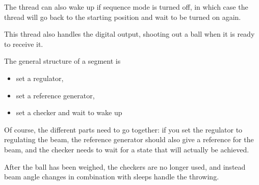 The thread can also wake up if sequence mode is turned off, in which case the thread will go back to the starting position and wait to be turned on again.

This thread also handles the digital output, shooting out a ball when it is ready to receive it.

The general structure of a segment is
\begin{itemize}
\item set a regulator,
\item set a reference generator,
\item set a checker and wait to wake up
\end{itemize}

Of course, the different parts need to go together: if you set the regulator to regulating the beam, the reference generator should also give a reference for the beam, and the checker needs to wait for a state that will actually be achieved.

After the ball has been weighed, the checkers are no longer used, and instead beam angle changes in combination with sleeps handle the throwing.
